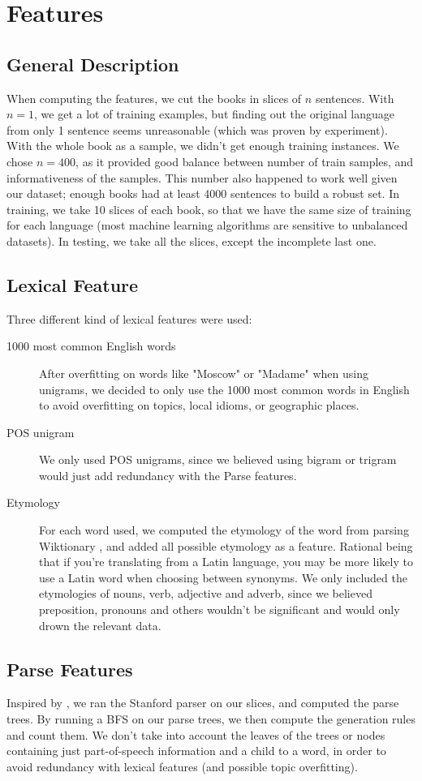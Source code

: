 \documentclass[10pt]{article}
\begin{document}
\section{Features}
\subsection{General Description}
When computing the features, we cut the books in slices of $n$ sentences. With $n=1$, we get a lot of training examples, but finding out the original language from only 1 sentence seems unreasonable (which was proven by experiment). With the whole book as a sample, we didn't get enough training instances. We chose $n=400$, as it provided good balance between number of train samples, and informativeness of the samples. This number also happened to work well given our dataset; enough books had at least 4000 sentences to build a robust set. In training, we take 10 slices of each book, so that we have the same size of training for each language (most machine learning algorithms are sensitive to unbalanced datasets). In testing, we take all the slices, except the incomplete last one.
\subsection{Lexical Feature}
Three different kind of lexical features were used:
\begin{description}
\item[1000 most common English words] After overfitting on words like "Moscow" or "Madame" when using unigrams, we decided to only use the 1000 most common words in English to avoid overfitting on topics, local idioms, or geographic places.
\item[POS unigram] We only used POS unigrams, since we believed using bigram or trigram would just add redundancy with the Parse features.
\item[Etymology] For each word used, we computed the etymology of the word from parsing Wiktionary \cite{Wiktionary}, and added all possible etymology as a feature. Rational being that if you're translating from a Latin language, you may be more likely to use a Latin word when choosing between synonyms. We only included the etymologies of nouns, verb, adjective and adverb, since we believed preposition, pronouns  and others wouldn't be significant and would only drown the relevant data.
\end{description}

\subsection{Parse Features}
Inspired by \cite{Parse}, we ran the Stanford parser on our slices, and computed the parse trees. By running a BFS on our parse trees, we then compute the generation rules and count them. We don't take into account the leaves of the trees or nodes containing just part-of-speech information and a child to a word, in order to avoid redundancy with lexical features (and possible topic overfitting).
\end{document}
